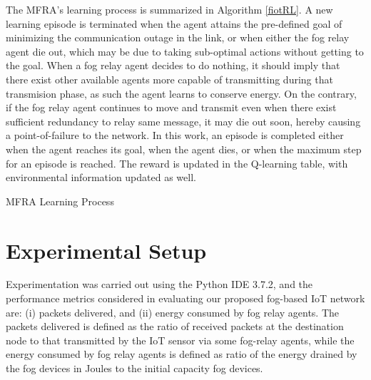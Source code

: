 \documentclass[journal]{IEEEtran}
\makeatletter
\def\BState{\State\hskip-\ALG@thistlm}
\makeatother
\begin{document}
The MFRA's learning process is summarized in Algorithm \ref{fiotRL}. A new learning episode is terminated when the agent attains the pre-defined goal of minimizing the communication outage in the link, or when either the fog relay agent die out, which may be due to taking sub-optimal actions without getting to the goal. When a fog relay agent decides to do nothing, it should imply that there exist other available agents more capable of transmitting during that transmision phase, as such the agent learns to conserve energy. On the contrary, if the fog relay agent continues to move and transmit even when there exist sufficient redundancy to relay same message, it may die out soon, hereby causing a point-of-failure to the network. In this work, an episode is completed either when the agent reaches its goal, when the agent dies, or when the maximum step for an episode is reached. The reward is updated in the Q-learning table, with environmental information updated as well.

\begin{algorithm}
\caption{MFRA Learning Process}\label{fiotRL}
\end{algorithm}



\section{Experimental Setup}
Experimentation was carried out using the Python IDE 3.7.2, and the performance metrics considered in evaluating our proposed fog-based IoT network are: (i) packets delivered, and (ii) energy consumed by fog relay agents. The packets delivered is defined as the ratio of received packets at the destination node to that transmitted by the IoT sensor via some fog-relay agents, while the energy consumed by fog relay agents is defined as ratio of the energy drained by the fog devices in Joules to the initial capacity fog devices.
\end{document}
